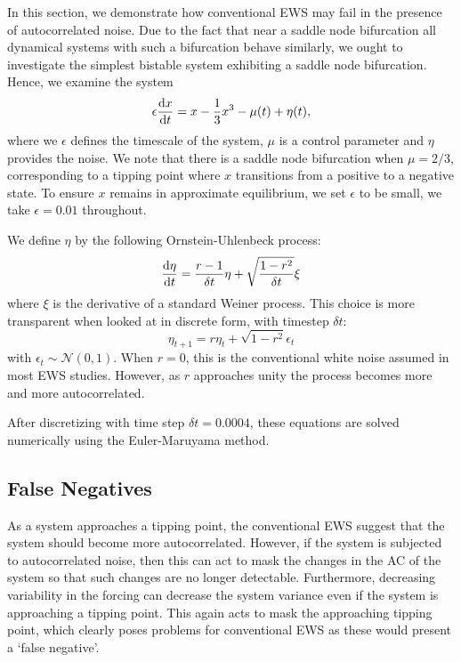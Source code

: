 In this section, we demonstrate how conventional EWS may fail in the presence of autocorrelated  noise. Due to the fact that near a
saddle node bifurcation all dynamical systems with such a
bifurcation behave similarly\cite{guckenheimer2013}, we ought to
investigate the simplest bistable system exhibiting a saddle node
bifurcation. Hence, we examine the system 
\begin{equation}
    \label{eq:dynamical_system}
    \epsilon\dv{x}{t} =  x - \frac{1}{3}x^3 - \mu(t) + \eta(t),
\end{equation}
where we $\epsilon$ defines the timescale of the system, $\mu$ is a control parameter and $\eta$ provides the noise. We note that there is a saddle node bifurcation
when $\mu = 2/3$, corresponding to a tipping point where
$x$ transitions from a positive to a negative state. To ensure
$x$ remains in approximate equilibrium, we set $\epsilon$ to be small,
we take $\epsilon = 0.01$ throughout.


We define $\eta$ by the following Ornstein-Uhlenbeck 
process\cite{Uhlenbeck1930}:
\begin{equation}
\label{eq:white_red_forcing}
    \dv{\eta}{t} = \frac{r-1}{\delta t}\eta + \sqrt{\frac{1-r^2}{\delta t}} \xi
\end{equation}
where $\xi$ is the derivative of a standard Weiner process. 
This choice is more transparent when looked at in discrete form, with timestep 
$\delta t$:
\begin{equation}
    \label{eq:discretized_white_or_red_noise}
    \eta_{t+1} = r\eta_t + \sqrt{1-r^2} \epsilon_t
\end{equation}
with $\epsilon_t \sim \mathcal{N}(0,1)$. When $r = 0$, this is 
the conventional white noise assumed in most EWS
studies. However, as $r$ approaches unity the process becomes
more and more autocorrelated.

After discretizing with time step $\delta t = 0.0004$,
these equations are solved numerically using the 
Euler-Maruyama method\cite{Jacobs2010}.


\subsection{False Negatives}
As a system approaches a tipping point, the conventional
EWS suggest that the system should become more
autocorrelated. However, if the system is subjected to autocorrelated noise,
then this can act to mask the changes in the AC of the system so that such
changes are no longer detectable. Furthermore, decreasing variability in
the forcing can decrease the system variance even if the system is 
approaching a tipping point. This again acts to mask the approaching tipping point, which clearly poses problems for conventional
EWS as these would present a `false negative'.

